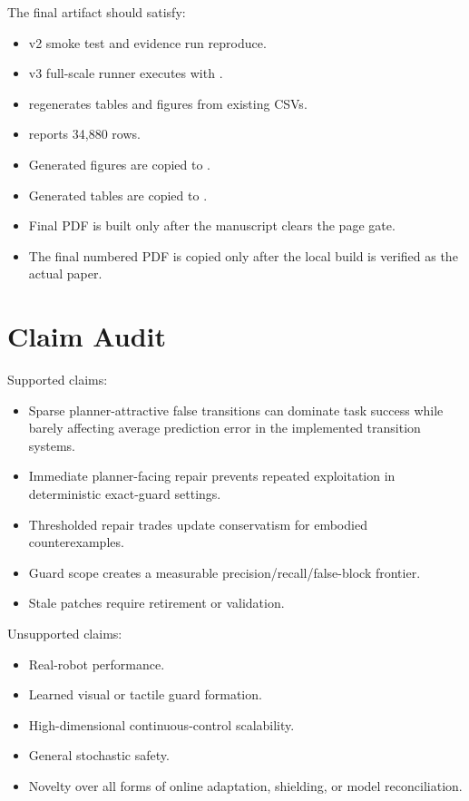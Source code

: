 \documentclass{article}
\begin{document}
The final artifact should satisfy:
\begin{itemize}
    \item v2 smoke test and evidence run reproduce.
    \item v3 full-scale runner executes with .
    \item {} regenerates tables and figures from existing CSVs.
    \item {} reports 34,880 rows.
    \item Generated figures are copied to .
    \item Generated tables are copied to .
    \item Final PDF is built only after the manuscript clears the page gate.
    \item The final numbered PDF is copied only after the local build is verified as the actual paper.
\end{itemize}

\section{Claim Audit}

Supported claims:
\begin{itemize}
    \item Sparse planner-attractive false transitions can dominate task success while barely affecting average prediction error in the implemented transition systems.
    \item Immediate planner-facing repair prevents repeated exploitation in deterministic exact-guard settings.
    \item Thresholded repair trades update conservatism for embodied counterexamples.
    \item Guard scope creates a measurable precision/recall/false-block frontier.
    \item Stale patches require retirement or validation.
\end{itemize}

Unsupported claims:
\begin{itemize}
    \item Real-robot performance.
    \item Learned visual or tactile guard formation.
    \item High-dimensional continuous-control scalability.
    \item General stochastic safety.
    \item Novelty over all forms of online adaptation, shielding, or model reconciliation.
\end{itemize}
\end{document}
